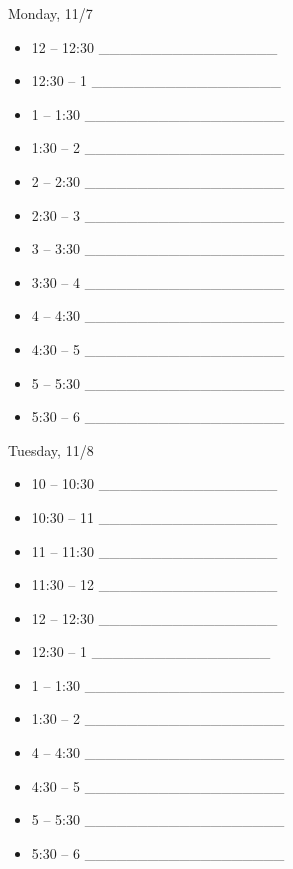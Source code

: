 \documentclass[]{article}
\begin{document}
Monday, 11/7

\begin{itemize}
\item
  12 -- 12:30 \_\_\_\_\_\_\_\_\_\_\_\_\_\_\_\_\_
\item
  12:30 -- 1 \_\_\_\_\_\_\_\_\_\_\_\_\_\_\_\_\_\_
\item
  1 -- 1:30 \_\_\_\_\_\_\_\_\_\_\_\_\_\_\_\_\_\_\_
\item
  1:30 -- 2 \_\_\_\_\_\_\_\_\_\_\_\_\_\_\_\_\_\_\_
\item
  2 -- 2:30 \_\_\_\_\_\_\_\_\_\_\_\_\_\_\_\_\_\_\_
\item
  2:30 -- 3 \_\_\_\_\_\_\_\_\_\_\_\_\_\_\_\_\_\_\_
\item
  3 -- 3:30 \_\_\_\_\_\_\_\_\_\_\_\_\_\_\_\_\_\_\_
\item
  3:30 -- 4 \_\_\_\_\_\_\_\_\_\_\_\_\_\_\_\_\_\_\_
\item
  4 -- 4:30 \_\_\_\_\_\_\_\_\_\_\_\_\_\_\_\_\_\_\_
\item
  4:30 -- 5 \_\_\_\_\_\_\_\_\_\_\_\_\_\_\_\_\_\_\_
\item
  5 -- 5:30 \_\_\_\_\_\_\_\_\_\_\_\_\_\_\_\_\_\_\_
\item
  5:30 -- 6 \_\_\_\_\_\_\_\_\_\_\_\_\_\_\_\_\_\_\_
\end{itemize}

Tuesday, 11/8

\begin{itemize}
\item
  10 -- 10:30 \_\_\_\_\_\_\_\_\_\_\_\_\_\_\_\_\_
\item
  10:30 -- 11 \_\_\_\_\_\_\_\_\_\_\_\_\_\_\_\_\_
\item
  11 -- 11:30 \_\_\_\_\_\_\_\_\_\_\_\_\_\_\_\_\_
\item
  11:30 -- 12 \_\_\_\_\_\_\_\_\_\_\_\_\_\_\_\_\_
\item
  12 -- 12:30 \_\_\_\_\_\_\_\_\_\_\_\_\_\_\_\_\_
\item
  12:30 -- 1 \_\_\_\_\_\_\_\_\_\_\_\_\_\_\_\_\_
\item
  1 -- 1:30 \_\_\_\_\_\_\_\_\_\_\_\_\_\_\_\_\_\_\_
\item
  1:30 -- 2 \_\_\_\_\_\_\_\_\_\_\_\_\_\_\_\_\_\_\_
\item
  4 -- 4:30 \_\_\_\_\_\_\_\_\_\_\_\_\_\_\_\_\_\_\_
\item
  4:30 -- 5 \_\_\_\_\_\_\_\_\_\_\_\_\_\_\_\_\_\_\_
\item
  5 -- 5:30 \_\_\_\_\_\_\_\_\_\_\_\_\_\_\_\_\_\_\_
\item
  5:30 -- 6 \_\_\_\_\_\_\_\_\_\_\_\_\_\_\_\_\_\_\_
\end{itemize}
\end{document}
